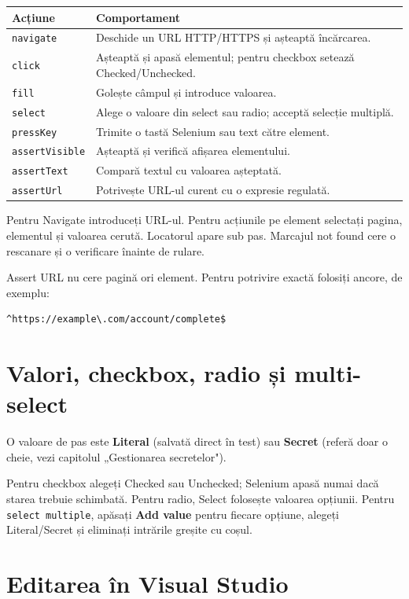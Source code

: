 \documentclass[12pt,a4paper]{report}
\newcommand{\UI}[1]{\textbf{#1}}
\newcommand{\File}[1]{\nolinkurl{#1}}
\newcommand{\Action}[1]{\texttt{#1}}
\begin{document}
\begin{tabularx}{\textwidth}{@{}p{3.0cm}Y@{}}
\toprule \textbf{Acțiune} & \textbf{Comportament} \\
\midrule
\Action{navigate} & Deschide un URL HTTP/HTTPS și așteaptă încărcarea. \\
\Action{click} & Așteaptă și apasă elementul; pentru checkbox setează Checked/Unchecked. \\
\Action{fill} & Golește câmpul și introduce valoarea. \\
\Action{select} & Alege o valoare din select sau radio; acceptă selecție multiplă. \\
\Action{pressKey} & Trimite o tastă Selenium sau text către element. \\
\Action{assertVisible} & Așteaptă și verifică afișarea elementului. \\
\Action{assertText} & Compară textul cu valoarea așteptată. \\
\Action{assertUrl} & Potrivește URL-ul curent cu o expresie regulată. \\
\bottomrule
\end{tabularx}

Pentru Navigate introduceți URL-ul. Pentru acțiunile pe element selectați pagina, elementul și valoarea cerută. Locatorul apare sub pas. Marcajul not found cere o rescanare și o verificare înainte de rulare.

Assert URL nu cere pagină ori element. Pentru potrivire exactă folosiți ancore, de exemplu:

\begin{lstlisting}
^https://example\.com/account/complete$
\end{lstlisting}

\section{Valori, checkbox, radio și multi-select}

O valoare de pas este \UI{Literal} (salvată direct în test) sau \UI{Secret} (referă doar o cheie, vezi capitolul „Gestionarea secretelor").

Pentru checkbox alegeți Checked sau Unchecked; Selenium apasă numai dacă starea trebuie schimbată. Pentru radio, Select folosește valoarea opțiunii. Pentru \File{select multiple}, apăsați \UI{Add value} pentru fiecare opțiune, alegeți Literal/Secret și eliminați intrările greșite cu coșul.

\section{Editarea în Visual Studio}
\end{document}
